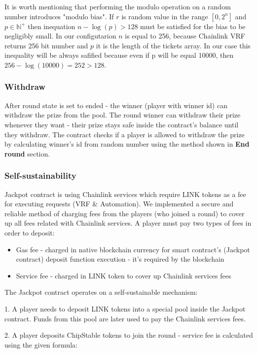 \documentclass[12pt]{article}
\begin{document}
It is worth mentioning that performing the modulo operation on a random number introduces "modulo bias"\cite{modulobias}. If \(r\) is random value in the range \([0, 2^{n}]\) and \(p \in \mathbb{N}^{+}\) then inequation \(n - \log(p) > 128 \) must be satisfied for the bias to be negligibly small. In our configutarion \(n\) is equal to 256, because Chainlink VRF returns 256 bit number and \(p\) it is the length of the tickets array. 
In our case this inequality will be always safified because even if p will be equal 10000, then \(256 - \log(10000) = 252 > 128 \).

\subsubsection{Withdraw}
After round state is set to ended - the winner (player with winner id) can withdraw the prize from the pool. The round winner can withdraw their prize whenever they want - their prize stays safe inside the contract's balance until they withdraw. The contract checks if a player is allowed to withdraw the prize by calculating winner's id from random number using the method shown in \textbf{End round} section.

\subsubsection{Self-sustainability}
Jackpot contract is using Chainlink services which require LINK tokens as a fee for executing requests (VRF \& Automation). We implemented a secure and reliable method of charging fees from the players (who joined a round) to cover up all fees related with Chainlink services. A player must pay two types of fees in order to deposit:
\begin{itemize}
    \item Gas fee - charged in native blockchain currency for smart contract's (Jackpot contract) deposit function execution - it's required by the blockchain
    \item Service fee - charged in LINK token to cover up Chainlink services fees
\end{itemize}

The Jackpot contract operates on a self-sustainable mechanism:

1. A player needs to deposit LINK tokens into a special pool inside the Jackpot contract. Funds from this pool are later used to pay the Chainlink services fees.

2. A player deposits ChipStable tokens to join the round - service fee is calculated using the given formula:
\end{document}
